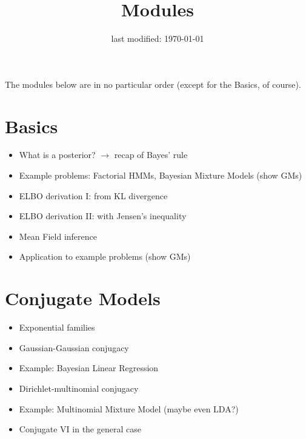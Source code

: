 \documentclass[11pt, a4paper]{article}
\title{Modules}
\date{last modified: \today}
\author{}
\begin{document}
\maketitle


The modules below are in no particular order (except for the Basics, of course).

 
\section{Basics}

\begin{itemize}
\item What is a posterior? $ \rightarrow $ recap of Bayes' rule
\item Example problems: Factorial HMMs, Bayesian Mixture Models (show GMs)
\item ELBO derivation I: from KL divergence
\item ELBO derivation II: with Jensen's inequality
\item Mean Field inference
\item Application to example problems (show GMs)
\end{itemize}

\section{Conjugate Models}

\begin{itemize}
\item Exponential families
\item Gaussian-Gaussian conjugacy
\item Example: Bayesian Linear Regression
\item Dirichlet-multinomial conjugacy
\item Example: Multinomial Mixture Model (maybe even LDA?) %
\item Conjugate VI in the general case \citep{Beal:2003}
\end{itemize}
\end{document}
